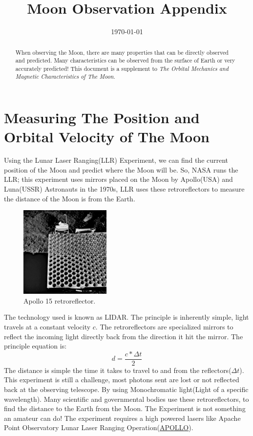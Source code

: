 \documentclass[12pt,oneside,a4paper,english]{article}
\author{}
\title{\textbf{Moon Observation Appendix}}
\date{\today}
\begin{document}
\maketitle
\begin{abstract}
    When observing the Moon, there are many properties that can be directly observed and predicted. Many characteristics can be observed from the surface of Earth or very accurately predicted! This document is a supplement to \textit{The Orbital Mechanics and Magnetic Characteristics of The Moon}.
\end{abstract}
\section{Measuring The Position and Orbital Velocity of The Moon}
Using the Lunar Laser Ranging(LLR) Experiment, we can find the current position of the Moon and predict where the Moon will be. So, NASA runs the LLR; this experiment uses mirrors placed on the Moon by Apollo(USA) and Luna(USSR) Astronauts in the 1970s, LLR uses these retroreflectors to measure the distance of the Moon is from the Earth. 
\begin{figure}[H]
    \centering
    \includegraphics[width=0.4\textwidth]{Reflector.png}
    \caption{Apollo 15 retroreflector. \cite{apolloretro}}
    \label{fig:apolloretro}
\end{figure}
The technology used is known as LIDAR. The principle is inherently simple, light travels at a constant velocity $c$. The retroreflectors are specialized mirrors to reflect the incoming light directly back from the direction it hit the mirror. The principle equation is:
\begin{equation}
    d=\frac{c*\Delta t}{2}
\end{equation}
The distance is simple the time it takes to travel to and from the reflectors($\Delta t$). This experiment is still a challenge, most photons sent are lost or not reflected back at the observing telescope. By using Monochromatic light(Light of a specific wavelength). Many scientific and governmental bodies use these retroreflectors, to find the distance to the Earth from the Moon. The Experiment is not something an amateur can do! The experiment requires a high powered lasers like Apache Point Observatory Lunar Laser Ranging Operation(\href{https://tmurphy.physics.ucsd.edu/apollo/apparatus.html}{APOLLO}). 
\end{document}
